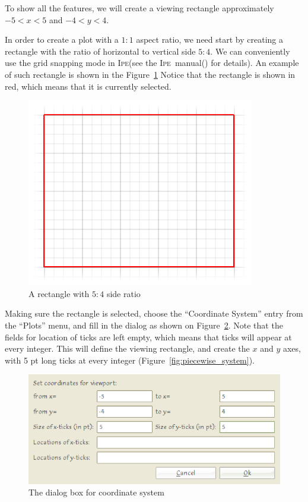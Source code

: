 \documentclass{article}
\def\Ipe{\textsc{Ipe}}
\begin{document}
To show all the features, we will create a viewing rectangle approximately $-5
< x < 5$ and $-4 < y < 4$. 

In order to create a plot with a $1:1$ aspect ratio, we need start by creating
a rectangle with the ratio of horizontal to vertical side $5:4$.  We can
conveniently use the grid snapping mode in \Ipe (see the \Ipe\
manual(\cite{manual}) for details).  An example of such rectangle
is shown in the Figure~\ref{fig:piecewise_starting_rectangle}  Notice that the
rectangle is shown in {\color{red}red}, which means that it is currently
selected. 
\begin{figure}[h]
   \begin{center}
      \includegraphics[scale=2]{piecewise_starting_rectangle.png}
   \end{center}
   \caption{A rectangle with $5:4$ side ratio}
   \label{fig:piecewise_starting_rectangle}
\end{figure}

Making sure the rectangle is selected, choose the ``Coordinate System'' entry
from the ``Plots'' menu, and fill in the dialog as shown on
Figure~\ref{fig:piecewise_system_dialog}.  Note that the fields for location of
ticks are left empty, which means that ticks will appear at every integer.  This will define the viewing
rectangle, and create the $x$ and $y$ axes, with 5 pt long ticks at every
integer (Figure~\ref{fig:piecewise_system}).  
\begin{figure}[h]
   \begin{center}
      \includegraphics[scale=3]{piecewise_system_dialog.png}
   \end{center}
   \caption{The dialog box for coordinate system}
   \label{fig:piecewise_system_dialog}
\end{figure}
\end{document}
